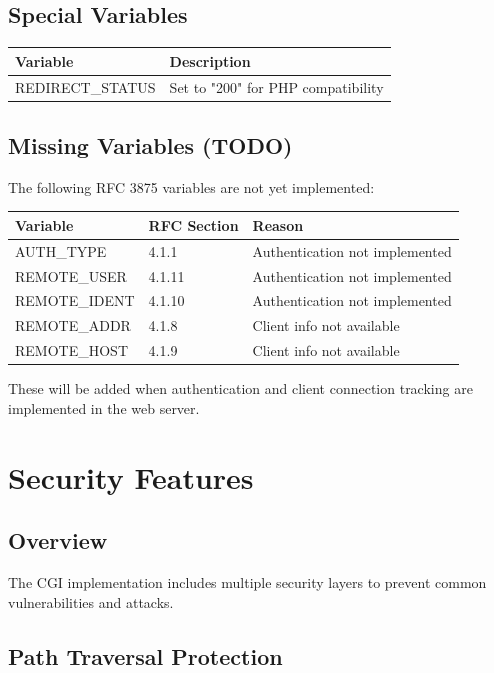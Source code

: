 \documentclass[11pt,a4paper]{article}
\begin{document}
\subsection{Special Variables}

\begin{tabular}{|l|p{8cm}|}
\hline
\textbf{Variable} & \textbf{Description} \\
\hline
REDIRECT\_STATUS & Set to "200" for PHP compatibility \\
\hline
\end{tabular}

\subsection{Missing Variables (TODO)}

The following RFC 3875 variables are not yet implemented:

\begin{tabular}{|l|l|p{6cm}|}
\hline
\textbf{Variable} & \textbf{RFC Section} & \textbf{Reason} \\
\hline
AUTH\_TYPE & 4.1.1 & Authentication not implemented \\
\hline
REMOTE\_USER & 4.1.11 & Authentication not implemented \\
\hline
REMOTE\_IDENT & 4.1.10 & Authentication not implemented \\
\hline
REMOTE\_ADDR & 4.1.8 & Client info not available \\
\hline
REMOTE\_HOST & 4.1.9 & Client info not available \\
\hline
\end{tabular}

These will be added when authentication and client connection tracking are implemented in the web server.

\newpage
\section{Security Features}

\subsection{Overview}

The CGI implementation includes multiple security layers to prevent common vulnerabilities and attacks.

\subsection{Path Traversal Protection}
\end{document}

